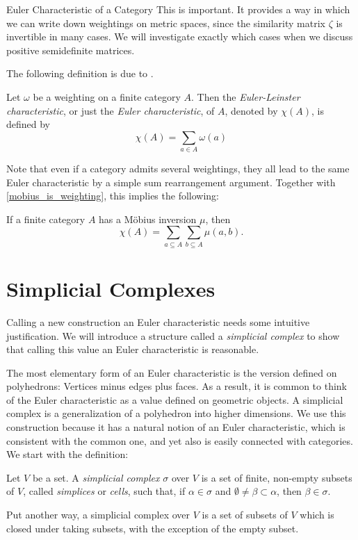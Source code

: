 \documentclass[12pt]{pom_thesis}
\begin{document}
\begin{chapter}{Euler Characteristic of a Category}
This is important. It provides a way in which we can write down weightings on metric spaces, since the similarity matrix $\zeta$ is invertible in many cases. We will investigate exactly which cases when we discuss positive semidefinite matrices.

The following definition is due to \cite{Lein1}.
\begin{defn}\label{cat_euler}
Let $\omega$ be a weighting on a finite category $A$. Then the \emph{Euler-Leinster characteristic}, or just the \emph{Euler characteristic}, of $A$, denoted by $\chi(A)$, is defined by
\[
\chi(A) = \sum_{a \in A} \omega(a)
\]
\end{defn}
Note that even if a category admits several weightings, they all lead to the same Euler characteristic by a simple sum rearrangement argument. Together with \ref{mobius_is_weighting}, this implies the following:
\begin{cor}\label{euler_mu}
If a finite category $A$ has a M\"obius inversion $\mu$, then
\[\chi(A) = \sum_{a \subseteq A} \sum_{b \subseteq A} \mu(a, b).
\]
\end{cor}

\section{Simplicial Complexes}
Calling a new construction an Euler characteristic needs some intuitive justification. We will introduce a structure called a \textit{simplicial complex} to show that calling this value an Euler characteristic is reasonable. 

The most elementary form of an Euler characteristic is the version defined on polyhedrons: Vertices minus edges plus faces. As a result, it is common to think of the Euler characteristic as a value defined on geometric objects. A simplicial complex is a generalization of a polyhedron into higher dimensions. We use this construction because it has a natural notion of an Euler characteristic, which is consistent with the common one, and yet also is easily connected with categories. We start with the definition:

\begin{defn}
Let $V$ be a set. A \emph{simplicial complex} $\sigma$ over $V$ is a set of finite, non-empty subsets of $V$, called \emph{simplices} or \emph{cells}, such that, if $\alpha \in \sigma$ and $\emptyset \neq \beta \subset \alpha$, then $\beta \in \sigma$.
\end{defn}

Put another way, a simplicial complex over $V$  is a set of subsets of $V$ which is closed under taking subsets, with the exception of the empty subset. 


\end{chapter}
\end{document}
